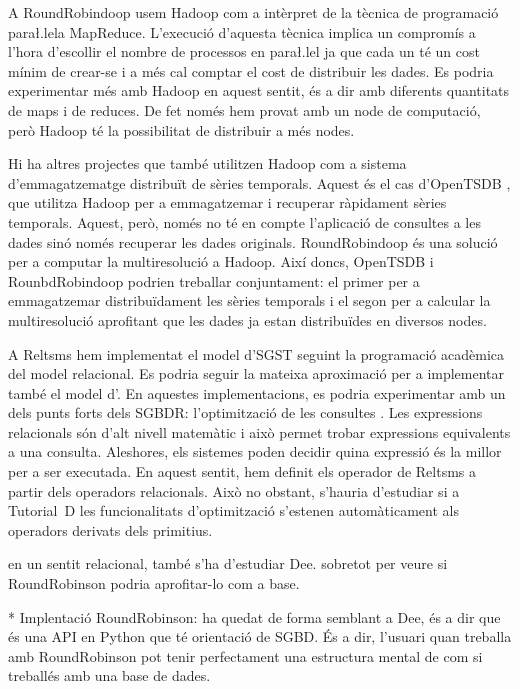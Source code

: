 
A RoundRobindoop usem Hadoop com a intèrpret de la tècnica de
programació para\l.lela MapReduce. L'execució d'aquesta tècnica
implica un compromís a l'hora d'escollir el nombre de processos en
para\l.lel ja que cada un té un cost mínim de crear-se i a més cal
comptar el cost de distribuir les dades. Es podria experimentar més
amb Hadoop en aquest sentit, és a dir amb diferents quantitats de maps
i de reduces. De fet només hem provat amb un node de computació, però
Hadoop té la possibilitat de distribuir a més nodes.


Hi ha altres projectes que també utilitzen Hadoop com a sistema
d'emmagatzematge distribuït de sèries temporals. Aquest és el cas
d'OpenTSDB \parencite{opentsdb}, que utilitza Hadoop per a
emmagatzemar i recuperar ràpidament sèries temporals.  Aquest, però,
només no té en compte l'aplicació de consultes a les dades sinó només
recuperar les dades originals.  RoundRobindoop és una solució per a
computar la multiresolució a Hadoop. Així doncs, OpenTSDB i
RounbdRobindoop podrien treballar conjuntament: el primer per a
emmagatzemar distribuïdament les sèries temporals i el segon per a
calcular la multiresolució aprofitant que les dades ja estan
distribuïdes en diversos nodes.





A Reltsms hem implementat el model d'\gls{SGST} seguint la programació
acadèmica del model relacional. Es podria seguir la mateixa
aproximació per a implementar també el model d'.  En
aquestes implementacions, es podria experimentar amb un dels punts
forts dels \gls{SGBDR}: l'optimització de les
consultes \parencite[\gls{capitol}~18
\emph{Optimization}]{date04:introduction8}. Les expressions
relacionals són d'alt nivell matemàtic i això permet trobar
expressions equivalents a una consulta. Aleshores, els sistemes poden
decidir quina expressió és la millor per a ser executada.  En aquest
sentit, hem definit els operador de Reltsms a partir dels operadors
relacionals. Això no obstant, s'hauria d'estudiar si a Tutorial~D les
funcionalitats d'optimització s'estenen automàticament als operadors
derivats dels primitius.






en un sentit relacional, també s'ha d'estudiar Dee. sobretot per veure si RoundRobinson podria aprofitar-lo com a base.

* Implentació RoundRobinson: ha quedat de forma semblant a Dee, és a dir que és una API en Python que té orientació de \gls{SGBD}. És a dir, l'usuari quan treballa amb RoundRobinson pot tenir perfectament una estructura mental de com si treballés amb una base de dades.





